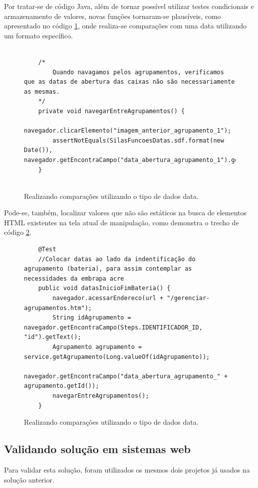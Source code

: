 \documentclass[tg]{mdtufsm}
\begin{document}
Por tratar-se de código Java, além de tornar possível utilizar testes condicionais e armazenamento de valores, novas funções tornaram-se plausíveis, como apresentado no código \ref{code:seleniumDate}, onde realiza-se comparações com uma data utilizando um formato específico.

\begin{figure}[!htt]
	\begin{lstlisting}

	/*
		Quando navagamos pelos agrupamentos, verificamos que as datas de abertura das caixas não são necessariamente as mesmas.
	*/		
	private void navegarEntreAgrupamentos() {
		navegador.clicarElemento("imagem_anterior_agrupamento_1");
		assertNotEquals(SilasFuncoesDatas.sdf.format(new Date()), navegador.getEncontraCampo("data_abertura_agrupamento_1").getText());
	}
	
	\end{lstlisting}
	\caption{Realizando comparações utilizando o tipo de dados data.}
	\label{code:seleniumDate}
\end{figure}

Pode-se, também, localizar valores que não são estáticos na busca de elementos HTML existentes na tela atual de manipulação, como demonstra o trecho de código \ref{code:seleniumBuscaId}.

\begin{figure}[!htt]
	\begin{lstlisting}
	@Test
	//Colocar datas ao lado da indentificação do agrupamento (bateria), para assim contemplar as necessidades da embrapa acre
	public void datasInicioFimBateria() {
		navegador.acessarEndereco(url + "/gerenciar-agrupamentos.htm");
		String idAgrupamento = navegador.getEncontraCampo(Steps.IDENTIFICADOR_ID, "id").getText();
		Agrupamento agrupamento = service.getAgrupamento(Long.valueOf(idAgrupamento));
		navegador.getEncontraCampo("data_abertura_agrupamento_" + agrupamento.getId());
		navegarEntreAgrupamentos();
	}	
	\end{lstlisting}
	\caption{Realizando comparações utilizando o tipo de dados data.}
	\label{code:seleniumBuscaId}
\end{figure}


\subsection{Validando solução em sistemas web}
Para validar esta solução, foram utilizados os mesmos dois projetos já usados na solução anterior.
\end{document}
